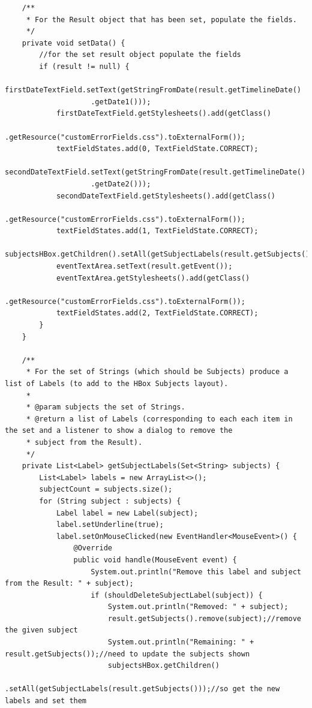 \begin{lstlisting}
    /**
     * For the Result object that has been set, populate the fields.
     */
    private void setData() {
        //for the set result object populate the fields
        if (result != null) {
            firstDateTextField.setText(getStringFromDate(result.getTimelineDate()
            		.getDate1()));
            firstDateTextField.getStylesheets().add(getClass()
            		.getResource("customErrorFields.css").toExternalForm());
            textFieldStates.add(0, TextFieldState.CORRECT);
            secondDateTextField.setText(getStringFromDate(result.getTimelineDate()
            		.getDate2()));
            secondDateTextField.getStylesheets().add(getClass()
            		.getResource("customErrorFields.css").toExternalForm());
            textFieldStates.add(1, TextFieldState.CORRECT);
            subjectsHBox.getChildren().setAll(getSubjectLabels(result.getSubjects()));
            eventTextArea.setText(result.getEvent());
            eventTextArea.getStylesheets().add(getClass()
            		.getResource("customErrorFields.css").toExternalForm());
            textFieldStates.add(2, TextFieldState.CORRECT);
        }
    }

    /**
     * For the set of Strings (which should be Subjects) produce a list of Labels (to add to the HBox Subjects layout).
     *
     * @param subjects the set of Strings.
     * @return a list of Labels (corresponding to each each item in the set and a listener to show a dialog to remove the
     * subject from the Result).
     */
    private List<Label> getSubjectLabels(Set<String> subjects) {
        List<Label> labels = new ArrayList<>();
        subjectCount = subjects.size();
        for (String subject : subjects) {
            Label label = new Label(subject);
            label.setUnderline(true);
            label.setOnMouseClicked(new EventHandler<MouseEvent>() {
                @Override
                public void handle(MouseEvent event) {
                    System.out.println("Remove this label and subject from the Result: " + subject);
                    if (shouldDeleteSubjectLabel(subject)) {
                        System.out.println("Removed: " + subject);
                        result.getSubjects().remove(subject);//remove the given subject
                        System.out.println("Remaining: " + result.getSubjects());//need to update the subjects shown
                        subjectsHBox.getChildren()
                        	.setAll(getSubjectLabels(result.getSubjects()));//so get the new labels and set them


\end{lstlisting}
